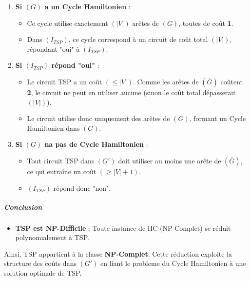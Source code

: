 \begin{enumerate}
\tightlist
\item
  \textbf{Si \((G)\) a un Cycle Hamiltonien} :

  \begin{itemize}
  \tightlist
  \item
    Ce cycle utilise exactement \((|V|)\) arêtes de \((G)\), toutes de
    coût \textbf{1}.
  \item
    Dans \((I_{TSP})\), ce cycle correspond à un circuit de coût total
    \((|V|)\), répondant "oui" à \((I_{TSP})\).
  \end{itemize}
\item
  \textbf{Si \((I_{TSP})\) répond "oui"} :

  \begin{itemize}
  \tightlist
  \item
    Le circuit TSP a un coût \((\leq |V|)\). Comme les arêtes de
    \((\overline{G})\) coûtent \textbf{2}, le circuit ne peut en
    utiliser aucune (sinon le coût total dépasserait \((|V|)\)).
  \item
    Le circuit utilise donc uniquement des arêtes de \((G)\), formant un
    Cycle Hamiltonien dans \((G)\).
  \end{itemize}
\item
  \textbf{Si \((G)\) n\textquotesingle a pas de Cycle Hamiltonien} :

  \begin{itemize}
  \tightlist
  \item
    Tout circuit TSP dans \((G')\) doit utiliser au moins une arête de
    \((\overline{G})\), ce qui entraîne un coût \((\geq |V| + 1)\).
  \item
    \((I_{TSP})\) répond donc "non".
  \end{itemize}
\end{enumerate}

\subparagraph{\texorpdfstring{\textbf{Conclusion}}{Conclusion}}\label{conclusion}

\begin{itemize}
\tightlist
\item
  \textbf{TSP est NP-Difficile} : Toute instance de HC (NP-Complet) se
  réduit polynomialement à TSP.
\end{itemize}

Ainsi, TSP appartient à la classe \textbf{NP-Complet}. Cette réduction
exploite la structure des coûts dans \(( G')\) en liant le probleme du
Cycle Hamiltonien à une solution optimale de TSP.


